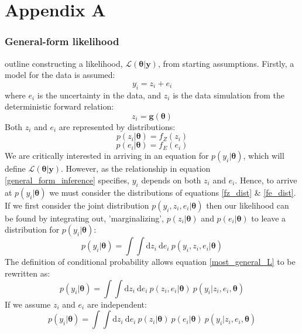 \chapter{Appendix A}
\label{AppendixA}

\subsection{General-form likelihood}
\citet[p.90-92]{gregory2005bayesian} outline constructing a likelihood, $\mathcal{L}(\bm{\theta}|\bm{y})$, from starting assumptions. Firstly, a model for the data is assumed:
\begin{equation}
y_i = z_i + e_i
\label{general_form_inference}
\end{equation}
where $e_i$ is the uncertainty in the data, and $z_i$ is the data simulation from the deterministic forward relation:
\begin{equation}
z_i = \bm{g}(\bm{\theta})
\end{equation}
Both $z_i$ and $e_i$ are represented by distributions:
\begin{equation}
p(z_i|\bm{\theta}) = f_Z(z_i)
\label{fz_dist}
\end{equation}
\begin{equation}
p(e_i|\bm{\theta}) = f_E(e_i)
\label{fe_dist}
\end{equation}
We are critically interested in arriving in an equation for $p(y_i|\bm{\theta})$, which will define $\mathcal{L}(\bm{\theta}|\bm{y})$. However, as the relationship in equation \ref{general_form_inference} specifies, $y_i$ depends on both $z_i$ and $e_i$. Hence, to arrive at $p(y_i|\bm{\theta})$ we must consider the distributions of equations \ref{fz_dist} \& \ref{fe_dist}. If we first consider the joint distribution $p(y_i,z_i,e_i|\bm{\theta})$ then our likelihood can be found by integrating out, 'marginalizing', $p(z_i|\bm{\theta})$ and $p(e_i|\bm{\theta})$ to leave a distribution for $p(y_i|\bm{\theta})$:
\begin{equation}
p(y_i|\bm{\theta}) = \int \int \text{d}z_i\ \text{d}e_i\ p(y_i,z_i,e_i|\bm{\theta})
\label{most_general_L}
\end{equation}
The definition of conditional probability allows equation \ref{most_general_L} to be rewritten as:
\begin{equation}
p(y_i|\bm{\theta}) = \int \int \text{d}z_i\ \text{d}e_i\ p(z_i,e_i|\bm{\theta})\ p(y_i|z_i,e_i,\bm{\theta})
\end{equation}
If we assume $z_i$ and $e_i$ are independent:
\begin{equation}
p(y_i|\bm{\theta}) = \int \int \text{d}z_i\ \text{d}e_i\ p(z_i|\bm{\theta})\ p(e_i|\bm{\theta})\ p(y_i|z_i,e_i,\bm{\theta})
\label{halfway_through_derivation}
\end{equation}
